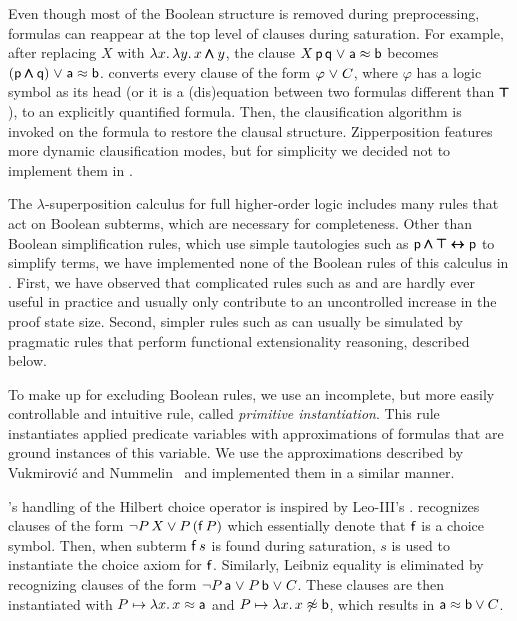  Even though most of the Boolean structure is
removed during preprocessing, formulas can reappear at the top level of
clauses during saturation. For example, after replacing $X$ with $\lambda x.
\, \lambda y.\, x \pmb\land y$, the clause $X \, \mathsf{p} \, \mathsf{q} \mathrel\lor \mathsf{a}
\approx \mathsf{b}$ becomes $(\mathsf{p} \pmb\land \mathsf{q}) \mathrel\lor \mathsf{a} \approx \mathsf{b}$. \ehohii{}
converts every clause of the form $\varphi \mathrel\lor C$, where $\varphi$ has a logic symbol
as its head (or it is a (dis)equation between two formulas different than $\pmb\top$),
to an explicitly quantified formula. Then, the clausification algorithm
is invoked on the formula to restore the clausal structure. Zipperposition features
more dynamic clausification modes, but for simplicity we decided
not to implement them in \ehohii{}.

The $\lambda$-superposition calculus for full higher-order logic
\cite{bbtv-21-full-ho-sup} includes many rules that act on Boolean subterms,
which are necessary for completeness. Other than Boolean simplification rules,
which use simple tautologies such as $\mathsf{p} \pmb\land \pmb\top \pmb\leftrightarrow\mathsf{p}$ to simplify terms, we
have implemented none of the Boolean rules of this calculus in \ehohii{}. First, we have
observed that complicated rules such as  and
 are hardly ever useful in practice and usually only
contribute to an uncontrolled increase in the proof state size. Second, simpler
rules such as  can usually be simulated by pragmatic rules
that perform functional extensionality reasoning, described below.

To make up for excluding Boolean rules, we use an incomplete, but more
easily controllable and intuitive rule, called \emph{primitive instantiation}. This
rule instantiates applied predicate variables with approximations of formulas
that are ground instances of this variable. We use the approximations described
by Vukmirovi\'c and Nummelin~\cite[Sect.~3.3]{bool-chapter} and
implemented them in a similar manner.

\ehohii{}'s handling of the Hilbert choice operator is inspired by Leo-III's
\cite{sb-21-leo3}. \ehohii{}
recognizes clauses of the form $\neg P \, X \lor P \, (\mathsf{f} \, P)$ which
essentially denote that $\mathsf{f}$ is a choice symbol. Then, when subterm
$\mathsf{f} \, s$ is found during saturation, $s$ is used to instantiate the choice
axiom for $\mathsf{f}$. 
%
Similarly, Leibniz equality \cite{bool-chapter} is eliminated by
recognizing clauses of the form  $\neg P \, \mathsf{a} \mathrel\lor P \, \mathsf{b} \mathrel\lor C$. These clauses are then
instantiated with $P \mapsto \lambda x. \, x \approx \mathsf{a}$ and $P \mapsto \lambda
x. \, x\not\approx\mathsf{b}$, which results in $\mathsf{a} \approx \mathsf{b} \lor C$.

